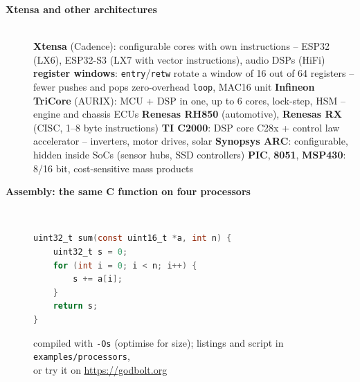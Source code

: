 \begin{description}
\item[{\rot\bf Xtensa and other architectures}]~\\[-\lblskip]
\bi
	\ite \textbf{Xtensa} (Cadence): configurable cores with own instructions -- ESP32 (LX6), ESP32-S3 (LX7 with vector instructions), audio DSPs (HiFi)
	\bi
		\ite \textbf{register windows}: \texttt{entry}/\texttt{retw} rotate a window of 16 out of 64 registers -- fewer pushes and pops
		\ite zero-overhead \texttt{loop}, MAC16 unit
	\ei
	\ite \textbf{Infineon TriCore} (AURIX): MCU + DSP in one, up to 6 cores, lock-step, HSM -- engine and chassis ECUs
	\ite \textbf{Renesas RH850} (automotive), \textbf{Renesas RX} (CISC, 1--8 byte instructions)
	\ite \textbf{TI C2000}: DSP core C28x + control law accelerator -- inverters, motor drives, solar
	\ite \textbf{Synopsys ARC}: configurable, hidden inside SoCs (sensor hubs, SSD controllers)
	\ite \textbf{PIC}, \textbf{8051}, \textbf{MSP430}: 8/16 bit, cost-sensitive mass products
\ei
{}
\os{\newpage}

\item[{\rot\bf Assembly: the same C function on four processors}]~\\[-\lstskip]
\begin{lstlisting}[language=C]
uint32_t sum(const uint16_t *a, int n) {
    uint32_t s = 0;
    for (int i = 0; i < n; i++) {
        s += a[i];
    }
    return s;
}
\end{lstlisting}
\begin{center}
\end{center}
\bi
	\ite compiled with \texttt{-Os} (optimise for size); listings and script in \texttt{examples/\-processors},\\ or try it on \url{https://godbolt.org}
\ei
\os{\newpage}


\end{description}
